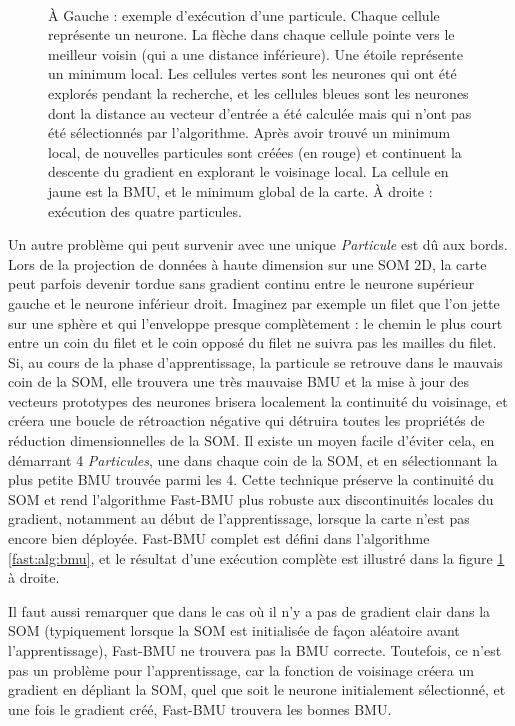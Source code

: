 	\begin{figure}[!t]
    	\centering
    	\ \ \ \ \ \ \ 
    	
		\caption[Visualisation de l'algorithme de particule]{À Gauche : exemple d'exécution d'une particule. Chaque cellule représente un neurone. La flèche dans chaque cellule pointe vers le meilleur voisin (qui a une distance inférieure). Une étoile représente un minimum local. Les cellules vertes sont les neurones qui ont été explorés pendant la recherche, et les cellules bleues sont les neurones dont la distance au vecteur d'entrée a été calculée mais qui n'ont pas été sélectionnés par l'algorithme. Après avoir trouvé un minimum local, de nouvelles particules sont créées (en rouge) et continuent la descente du gradient en explorant le voisinage local. La cellule en jaune est la BMU, et le minimum global de la carte. À droite : exécution des quatre particules.}
    	\label{fig:first_particle}
	\end{figure}

	Un autre problème qui peut survenir avec une unique \textit{Particule} est dû aux bords. Lors de la projection de données à haute dimension sur une SOM 2D, la carte peut parfois devenir tordue sans gradient continu entre le neurone supérieur gauche et le neurone inférieur droit. Imaginez par exemple un filet que l'on jette sur une sphère et qui l'enveloppe presque complètement : le chemin le plus court entre un coin du filet et le coin opposé du filet ne suivra pas les mailles du filet. Si, au cours de la phase d'apprentissage, la particule se retrouve dans le mauvais coin de la SOM, elle trouvera une très mauvaise BMU et la mise à jour des vecteurs prototypes des neurones brisera localement la continuité du voisinage, et créera une boucle de rétroaction négative qui détruira toutes les propriétés de réduction dimensionnelles de la SOM. Il existe un moyen facile d'éviter cela, en démarrant 4 \textit{Particules}, une dans chaque coin de la SOM, et en sélectionnant la plus petite BMU trouvée parmi les 4. Cette technique préserve la continuité du SOM et rend l'algorithme Fast-BMU plus robuste aux discontinuités locales du gradient, notamment au début de l'apprentissage, lorsque la carte n'est pas encore bien déployée. Fast-BMU complet est défini dans l'algorithme \ref{fast:alg:bmu}, et le résultat d'une exécution complète est illustré dans la figure \ref{fig:first_particle} à droite.
	
	Il faut aussi remarquer que dans le cas où il n'y a pas de gradient clair dans la SOM (typiquement lorsque la SOM est initialisée de façon aléatoire avant l'apprentissage), Fast-BMU ne trouvera pas la BMU correcte. Toutefois, ce n'est pas un problème pour l'apprentissage, car la fonction de voisinage créera un gradient en dépliant la SOM, quel que soit le neurone initialement sélectionné, et une fois le gradient créé, Fast-BMU trouvera les bonnes BMU.

